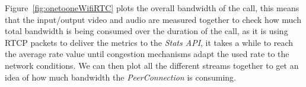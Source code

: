 Figure~\ref{fig:onetooneWifiRTC} plots the overall bandwidth of the call, this means that the input/output video and audio are measured together to check how much total bandwidth is being consumed over the duration of the call, as it is using RTCP packets to deliver the metrics to the {\it Stats API}, it takes a while to reach the average rate value until congestion mechanisms adapt the used rate to the network conditions. We can then plot all the different streams together to get an idea of how much bandwidth the {\it PeerConnection} is consuming.

%




